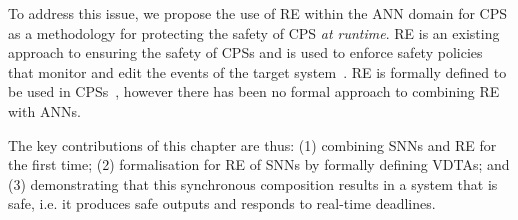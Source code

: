 To address this issue, we propose the use of \ac{RE} within the \ac{ANN} domain for \ac{CPS} as a methodology for protecting the safety of \ac{CPS} \textit{at runtime}.
\ac{RE} is an existing approach to ensuring the safety of \acp{CPS} and is used to enforce safety policies that monitor and edit the events of the target system~\cite{rta-cps}.
\ac{RE} is formally defined to be used in \acp{CPS}~\cite{recps}, however there has been no formal approach to combining \ac{RE} with \acp{ANN}. 

The key contributions of this chapter are thus: (1) combining \acp{SNN} and \ac{RE} for the first time; (2) formalisation for \ac{RE} of \acp{SNN} by formally defining \acfp{VDTA}; and (3) demonstrating that this synchronous composition results in a system that is safe, i.e. it produces safe outputs and responds to real-time deadlines. 

